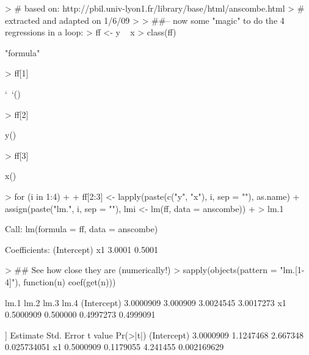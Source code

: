 \documentclass[12pt,letterpaper,final]{article}
\begin{document}
\begin{Schunk}
\begin{Sinput}
> # based on: http://pbil.univ-lyon1.fr/library/base/html/anscombe.html
> # extracted and adapted on 1/6/09
> 
> ##-- now some "magic" to do the 4 regressions in a loop: 
> ff <- y ~ x 
> class(ff)
\end{Sinput}
\begin{Soutput}
[1] "formula"
\end{Soutput}
\begin{Sinput}
> ff[1]
\end{Sinput}
\begin{Soutput}
`~`()
\end{Soutput}
\begin{Sinput}
> ff[2]
\end{Sinput}
\begin{Soutput}
y()
\end{Soutput}
\begin{Sinput}
> ff[3]
\end{Sinput}
\begin{Soutput}
x()
\end{Soutput}
\begin{Sinput}
> for (i in 1:4) 
+ { 
+   ff[2:3] <- lapply(paste(c("y", "x"), i, sep = ""), as.name) 
+   assign(paste("lm.", i, sep = ""), lmi <- lm(ff, data = anscombe)) 
+ } 
> lm.1
\end{Sinput}
\begin{Soutput}
Call:
lm(formula = ff, data = anscombe)

Coefficients:
(Intercept)           x1  
     3.0001       0.5001  
\end{Soutput}
\begin{Sinput}
> ## See how close they are (numerically!) 
> sapply(objects(pattern = "lm.[1-4]"), function(n) coef(get(n))) 
\end{Sinput}
\begin{Soutput}
                 lm.1     lm.2      lm.3      lm.4
(Intercept) 3.0000909 3.000909 3.0024545 3.0017273
x1          0.5000909 0.500000 0.4997273 0.4999091
\end{Soutput}
\begin{Soutput}
[[1]]
             Estimate Std. Error  t value    Pr(>|t|)
(Intercept) 3.0000909  1.1247468 2.667348 0.025734051
x1          0.5000909  0.1179055 4.241455 0.002169629


\end{Soutput}
\end{Schunk}
\end{document}
